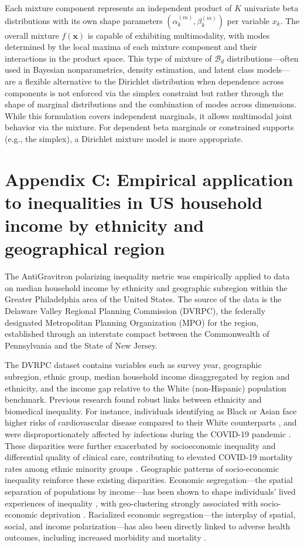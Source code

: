\documentclass[11pt]{article}
\begin{document}
Each mixture component represents an independent product of $K$ univariate beta distributions with its own shape parameters $(\alpha_k^{(m)}, \beta_k^{(m)})$ per variable $x_k$. The overall mixture $f(\mathbf{x})$ is capable of exhibiting multimodality, with modes determined by the local maxima of each mixture component and their interactions in the product space. This type of mixture of $\mathcal{B}_d$ distributions---often used in Bayesian nonparametrics, density estimation, and latent class models---are a flexible alternative to the Dirichlet distribution when dependence across components is not enforced via the simplex constraint but rather through the shape of marginal distributions and the combination of modes across dimensions. While this formulation covers independent marginals, it allows multimodal joint behavior via the mixture. For dependent beta marginals or constrained supports (e.g., the simplex), a Dirichlet mixture model is more appropriate.


\section*{Appendix C: Empirical application to inequalities in US household income by ethnicity and geographical region}

The AntiGravitron polarizing inequality metric was empirically applied to data on median household income by ethnicity and geographic subregion within the Greater Philadelphia area of the United States. The source of the data is the Delaware Valley Regional Planning Commission (DVRPC), the federally designated Metropolitan Planning Organization (MPO) for the region, established through an interstate compact between the Commonwealth of Pennsylvania and the State of New Jersey. 

The DVRPC dataset contains variables such as survey year, geographic subregion, ethnic group, median household income disaggregated by region and ethnicity, and the income gap relative to the White (non-Hispanic) population benchmark. Previous research \citep{ho2022ethnic, sze2020ethnicity, magesh2021disparities} found robust links between ethnicity and biomedical inequality. For instance, individuals identifying as Black or Asian face higher risks of cardiovascular disease compared to their White counterparts \citep{ho2022ethnic}, and were disproportionately affected by infections during the COVID-19 pandemic \citep{sze2020ethnicity}. These disparities were further exacerbated by socioeconomic inequality and differential quality of clinical care, contributing to elevated COVID-19 mortality rates among ethnic minority groups \citep{magesh2021disparities}. Geographic patterns of socio-economic inequality reinforce these existing disparities. Economic segregation---the spatial separation of populations by income---has been shown to shape individuals’ lived experiences of inequality \citep{davidai2024economic}, with geo-clustering strongly associated with socio-economic deprivation \citep{shin2019geo}. Racialized economic segregation---the interplay of spatial, social, and income polarization---has also been directly linked to adverse health outcomes, including increased morbidity and mortality \citep{xu2024two}.
\end{document}
